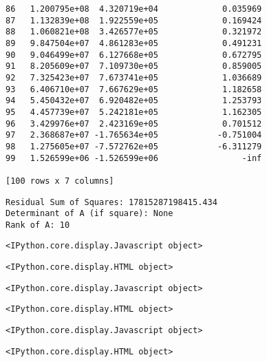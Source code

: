 \documentclass[11pt]{article}
\begin{document}
\begin{verbatim}
86   1.200795e+08  4.320719e+04             0.035969  
87   1.132839e+08  1.922559e+05             0.169424  
88   1.060821e+08  3.426577e+05             0.321972  
89   9.847504e+07  4.861283e+05             0.491231  
90   9.046499e+07  6.127668e+05             0.672795  
91   8.205609e+07  7.109730e+05             0.859005  
92   7.325423e+07  7.673741e+05             1.036689  
93   6.406710e+07  7.667629e+05             1.182658  
94   5.450432e+07  6.920482e+05             1.253793  
95   4.457739e+07  5.242181e+05             1.162305  
96   3.429976e+07  2.423169e+05             0.701512  
97   2.368687e+07 -1.765634e+05            -0.751004  
98   1.275605e+07 -7.572762e+05            -6.311279  
99   1.526599e+06 -1.526599e+06                 -inf  

[100 rows x 7 columns]
    \end{verbatim}

    
    \begin{Verbatim}[commandchars=\\\{\}]
Residual Sum of Squares: 17815287198415.434
Determinant of A (if square): None
Rank of A: 10

    \end{Verbatim}

    
    \begin{verbatim}
<IPython.core.display.Javascript object>
    \end{verbatim}

    
    
    \begin{verbatim}
<IPython.core.display.HTML object>
    \end{verbatim}

    
    
    \begin{verbatim}
<IPython.core.display.Javascript object>
    \end{verbatim}

    
    
    \begin{verbatim}
<IPython.core.display.HTML object>
    \end{verbatim}

    
    
    \begin{verbatim}
<IPython.core.display.Javascript object>
    \end{verbatim}

    
    
    \begin{verbatim}
<IPython.core.display.HTML object>
    \end{verbatim}
\end{document}
